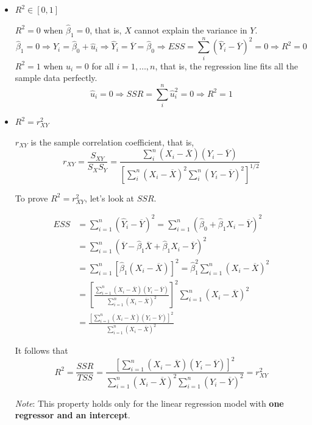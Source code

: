 \documentclass[a4paper,11pt]{article}
\begin{document}
\begin{itemize}
\item \(R^2 \in [0, 1]\)
\label{sec:org12bfba2}

\(R^2 = 0\) when \(\hat{\beta}_1 = 0\), that is, \(X\) cannot explain the
variance in \(Y\).
\begin{equation*}
\hat{\beta}_1 = 0 \Rightarrow Y_i = \hat{\beta}_0 + \hat{u}_i
\Rightarrow \hat{Y}_i = \overline{Y} = \hat{\beta}_0 \Rightarrow ESS
= \sum_i^n (\hat{Y}_i - \overline{Y})^2 = 0 \Rightarrow R^2 = 0
\end{equation*}
\(R^2 = 1\) when \(\hat{u}_i = 0\) for all \(i = 1, \ldots, n\), that is,
the regression line fits all the sample data perfectly.
\[ \hat{u}_i = 0 \Rightarrow SSR = \sum_i^n \hat{u}_i^2 = 0
  \Rightarrow R^2 = 1 \]

\item \(R^2 = r^2_{XY}\)
\label{sec:org733bdc8}

\(r_{XY}\) is the sample correlation coefficient, that is,
\[ r_{XY} = \frac{S_{XY}}{S_X S_Y} = \frac{\sum_i^n(X_i -
  \overline{X})(Y_i - \overline{Y})}{\left[\sum_i^n (X_i - \overline{X})^2 \sum_i^n (Y_i -
  \overline{Y})^2 \right]^{1/2}} \]

To prove \(R^2 = r^2_{XY}\), let's look at \(SSR\).

\begin{align*}
ESS &= \sum_{i=1}^n (\hat{Y}_i - \overline{Y})^2 = \sum_{i=1}^n (\hat{\beta}_0 + \hat{\beta}_1 X_i - \overline{Y})^2 \\
&= \sum_{i=1}^n (\overline{Y} - \hat{\beta}_1 \overline{X} + \hat{\beta}_1 X_i - \overline{Y})^2 \\
&= \sum_{i=1}^n \left[ \hat{\beta}_1 (X_i - \overline{X}) \right]^2 = \hat{\beta}_1^2 \sum_{i=1}^n (X_i - \overline{X})^2 \\
&= \left[\frac{\sum_{i=1}^n (X_i - \overline{X})(Y_i - \overline{Y})}{\sum_{i=1}^n (X_i - \overline{X})^2}\right]^2 \sum_{i=1}^n (X_i - \overline{X})^2 \\
&= \frac{\left[ \sum_{i=1}^n (X_i - \overline{X})(Y_i - \overline{Y}) \right]^2}{\sum_{i=1}^n (X_i - \overline{X})^2}
\end{align*}

It follows that
\[
  R^2 = \frac{SSR}{TSS} = \frac{\left[ \sum_{i=1}^n (X_i - \overline{X})(Y_i - \overline{Y}) \right]^2}{\sum_{i=1}^n (X_i - \overline{X})^2 \sum_{i=1}^n (Y_i - \overline{Y})^2} = r^2_{XY}
  \]

\emph{Note}: This property holds only for the linear regression model
with \textbf{one regressor and an intercept}.
\end{itemize}
\end{document}
